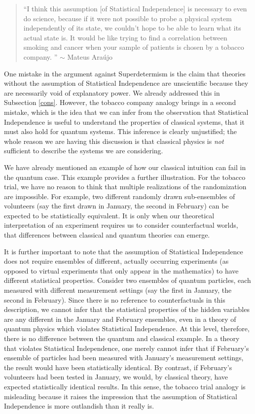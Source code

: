 \documentclass[12pt]{article}
\begin{document}
\begin{quote}
``I think this assumption [of Statistical Independence] is necessary to even do science, because if it were not possible to probe a physical system independently of its state, we couldn’t hope to be able to learn what its actual state is. It would be like trying to find a correlation between smoking and cancer when your sample of patients is chosen by a tobacco company.
'' 
$\sim$ Mateus Ara\'ujo \cite{Tobacco1}
\end{quote}

One mistake in the argument against Superdetermism is the claim that theories without the assumption of Statistical Independence are unscientific because they are necessarily void of explanatory power. We already addressed this in Subsection \ref{cons}. However, the tobacco company analogy brings in a second mistake, which is the idea that we can infer from the observation that Statistical Independence is useful to understand the properties of classical systems, that it must also hold for quantum systems. This inference is clearly unjustified; the whole reason we are having this discussion is that classical physics is {\sl not} sufficient to describe the systems we are considering.

We have already mentioned an example of how our classical intuition can fail in the quantum case. This example provides a further illustration. For the tobacco trial, we have no reason to think that multiple realizations of the randomization are impossible. For example, two different randomly drawn sub-ensembles of volunteers (say the first drawn in January, the second in February) can be expected to be statistically equivalent. It is only when our theoretical interpretation of an experiment requires us to consider counterfactual worlds, that differences between classical and quantum theories can emerge. 


It is further important to note that the assumption of Statistical Independence does not require ensembles of different, actually occurring experiments (as opposed to virtual experiments that only appear in the mathematics) to have different statistical properties. Consider two ensembles of quantum particles, each measured with different measurement settings (say the first in January, the second in February). Since there is no reference to counterfactuals in this description, we cannot infer that the statistical properties of the hidden variables are any different in the January and February ensembles, even in a theory of quantum physics which violates Statistical Independence. At this level, therefore, there is no difference between the quantum and classical example. In a theory that violates Statistical  Independence, one merely cannot infer that if February's ensemble of particles had been measured with January's measurement settings, the result would have been statistically identical. By contrast, if February's volunteers had been tested in January, we would, by classical theory, have expected statistically identical results. In this sense, the tobacco trial analogy is misleading because it raises the impression that the assumption of Statistical Independence is more outlandish than it really is.
\end{document}
